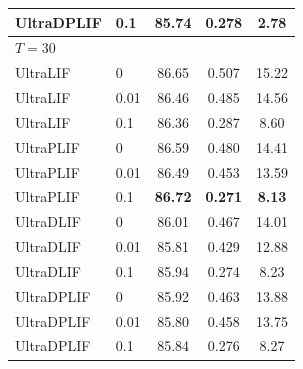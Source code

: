 \documentclass{article}
\theoremstyle{plain}
\theoremstyle{definition}
\theoremstyle{remark}
\begin{document}
\begin{table}[h]
\begin{center}
\begin{small}
\begin{tabular}{llccc}
UltraDPLIF & 0.1  & 85.74 & 0.278 & 2.78 \\
\midrule
\multicolumn{5}{l}{\textit{$T{=}30$}} \\
UltraLIF   & 0    & 86.65 & 0.507 & 15.22 \\
UltraLIF   & 0.01 & 86.46 & 0.485 & 14.56 \\
UltraLIF   & 0.1  & 86.36 & 0.287 & 8.60 \\
UltraPLIF  & 0    & 86.59 & 0.480 & 14.41 \\
UltraPLIF  & 0.01 & 86.49 & 0.453 & 13.59 \\
UltraPLIF  & 0.1  & \textbf{86.72} & \textbf{0.271} & \textbf{8.13} \\
UltraDLIF  & 0    & 86.01 & 0.467 & 14.01 \\
UltraDLIF  & 0.01 & 85.81 & 0.429 & 12.88 \\
UltraDLIF  & 0.1  & 85.94 & 0.274 & 8.23 \\
UltraDPLIF & 0    & 85.92 & 0.463 & 13.88 \\
UltraDPLIF & 0.01 & 85.80 & 0.458 & 13.75 \\
UltraDPLIF & 0.1  & 85.84 & 0.276 & 8.27 \\
\bottomrule
\end{tabular}
\end{small}
\end{center}
\vskip -0.1in
\end{table}
\end{document}
